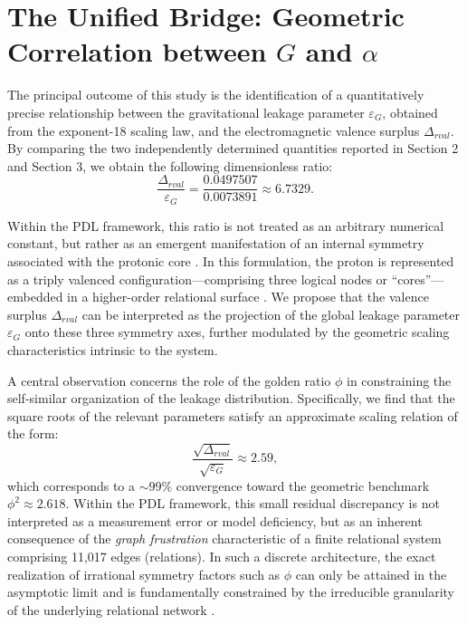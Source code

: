 \documentclass[11pt,a4paper]{article}
\newcommand{\eps}{\varepsilon}
\begin{document}
\section{The Unified Bridge: Geometric Correlation between \texorpdfstring{$G$}{G} and \texorpdfstring{$\alpha$}{alpha}}

The principal outcome of this study is the identification of a quantitatively precise relationship between the gravitational leakage parameter $\eps_G$, obtained from the exponent-18 scaling law, and the electromagnetic valence surplus $\Delta_{rval}$. By comparing the two independently determined quantities reported in Section 2 and Section 3, we obtain the following dimensionless ratio:
\begin{equation}
    \frac{\Delta_{rval}}{\eps_G} = \frac{0.0497507}{0.0073891} \approx 6.7329.
\end{equation}

Within the PDL framework, this ratio is not treated as an arbitrary numerical constant, but rather as an emergent manifestation of an internal symmetry associated with the protonic core \cite{Combinatorial_Proton_v2_2026, Effective_Fields_PDL_2026}. In this formulation, the proton is represented as a triply valenced configuration—comprising three logical nodes or “cores”—embedded in a higher-order relational surface \cite{PDL_Main_2026, PDL_Global_Mapping_2026}. We propose that the valence surplus $\Delta_{rval}$ can be interpreted as the projection of the global leakage parameter $\eps_G$ onto these three symmetry axes, further modulated by the geometric scaling characteristics intrinsic to the system.

A central observation concerns the role of the golden ratio $\phi$ in constraining the self-similar organization of the leakage distribution. Specifically, we find that the square roots of the relevant parameters satisfy an approximate scaling relation of the form:
\begin{equation}
    \frac{\sqrt{\Delta_{rval}}}{\sqrt{\eps_G}} \approx 2.59,
\end{equation}
which corresponds to a $\sim 99\%$ convergence toward the geometric benchmark $\phi^2 \approx 2.618$. Within the PDL framework, this small residual discrepancy is not interpreted as a measurement error or model deficiency, but as an inherent consequence of the \textit{graph frustration} characteristic of a finite relational system comprising 11,017 edges (relations). In such a discrete architecture, the exact realization of irrational symmetry factors such as $\phi$ can only be attained in the asymptotic limit and is fundamentally constrained by the irreducible granularity of the underlying relational network \cite{Topological_Reformulation_PDL_2026,Exponent_18_PDL_2026}.
\end{document}
